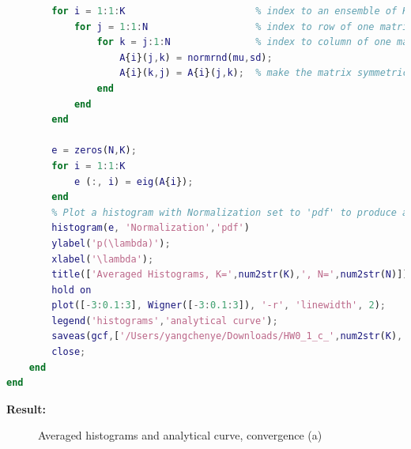 \documentclass[twoside]{homework}
\begin{document}
\begin{lstlisting}[language={Matlab}]
        % Creat an ensemble of K realizations of N x N Gaussian symmetric matrices
        for i = 1:1:K                       % index to an ensemble of K realizations
            for j = 1:1:N                   % index to row of one matrix
                for k = j:1:N               % index to column of one matrix
                    A{i}(j,k) = normrnd(mu,sd);
                    A{i}(k,j) = A{i}(j,k);  % make the matrix symmetric
                end
            end
        end

        e = zeros(N,K);
        for i = 1:1:K
            e (:, i) = eig(A{i});
        end
        % Plot a histogram with Normalization set to 'pdf' to produce an estimation of the probability density function.
        histogram(e, 'Normalization','pdf') 
        ylabel('p(\lambda)');
        xlabel('\lambda');
        title(['Averaged Histograms, K=',num2str(K),', N=',num2str(N)]);
        hold on
        plot([-3:0.1:3], Wigner([-3:0.1:3]), '-r', 'linewidth', 2);
        legend('histograms','analytical curve');
        saveas(gcf,['/Users/yangchenye/Downloads/HW0_1_c_',num2str(K),'_',num2str(N),'.png'])
        close;
    end
end
\end{lstlisting}
\textbf{Result:}
\begin{figure}[!h]
\centering
{}
\caption{Averaged histograms and analytical curve, convergence (a)}
\label{fig:c_a}
\end{figure}
\end{document}
